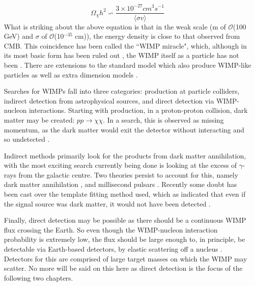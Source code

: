 \begin{equation}
    \Omega_\chi h^2 \backsim \frac{3\times 10^{-27} cm^3s^{-1}}{ \langle \sigma v \rangle}
\end{equation}
What is striking about the above equation is that in the weak scale (m of $\mathcal{O}$(100 GeV) and $\sigma$ of $\mathcal{O}$(10$^{-35}$ cm)), the energy density is close to that observed from CMB.
This coincidence has been called the ``WIMP miracle", which, although in its most basic form has been ruled out \cite{less_of_a_wimp_miracle_ref}, the WIMP itself as a particle has not been \cite{wimp_theory_ref}.
There are extensions to the standard model which also produce WIMP-like particles \cite{supersymetry_wimpy_boi_ref,supersymetry_wimpy_again_ref} as well as extra dimension models \cite{extradimention_wimps_ref}.

\par
Searches for WIMPs fall into three categories: production at particle colliders, indirect detection from astrophysical sources, and direct detection via WIMP-nucleon interactions.
Starting with production, in a proton-proton collision, dark matter may be created: $pp\xrightarrow{}\chi\chi$.
In a search, this is observed as missing momentum, as the dark matter would exit the detector without interacting and so undetected \cite{lhc_darkmatter_ref}.
\par
Indirect methods primarily look for the products from dark matter annihilation, with the most exciting search currently being done is looking at the excess of $\gamma$-rays from the galactic centre.
Two theories persist to account for this, namely dark matter annihilation \cite{galactic_gamma_excess_1_ref, galactic_gamma_excess_2_ref}, and millisecond pulsars \cite{galactic_gamma_excess_3_ref, galactic_gamma_excess_4_ref}.
Recently some doubt has been cast over the template fitting method used, which as indicated that even if the signal source was dark matter, it would not have been detected \cite{galactic_gamma_excess_5_ref}.
\par
Finally, direct detection may be possible as there should be a continuous WIMP flux crossing the Earth.
So even though the WIMP-nucleon interaction probability is extremely low, the flux should be large enough to, in principle, be detectable via Earth-based detectors, by elastic scattering off a nucleus \cite{wimp_nucleon_interactions_first_suggestion_ref,supersymmetric_dark_matter_ref}.
Detectors for this are comprised of large target masses on which the WIMP may scatter.
No more will be said on this here as direct detection is the focus of the following two chapters.

